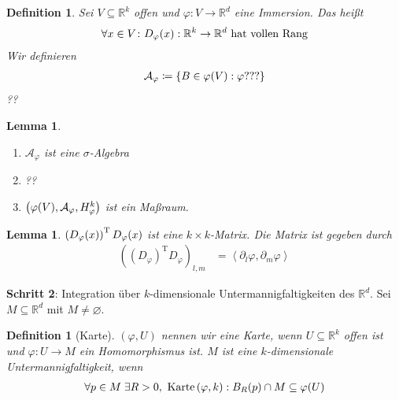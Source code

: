 \documentclass[11pt, twoside, a4paper]{article}
\theoremstyle{plain}
\newtheorem{definition}[blockelement]{Definition}
\newtheorem{lemma}[blockelement]{Lemma}
\numberwithin{equation}{subsection}
\newcommand{\set}[1]{\left\{#1\right\}}
\newcommand{\pair}[1]{\left(#1\right)}
\newcommand{\of}[1]{\mathopen{}\mathclose{}\bgroup\left(#1\aftergroup\egroup\right)}
\newcommand{\scalprod}[1]{\left<#1\right>}
\renewcommand{\emptyset}{\varnothing}
\newcommand{\ex}{\;\exists}
\newcommand{\theoremescape}{\leavevmode}
\newcommand{\R}{\mathbb{R}}
\newcommand{\mA}{\mathcal{A}}
\begin{document}
    \begin{definition}
        Sei $V\subseteq \R^k$ offen und $\varphi: V\to\R^d$ eine Immersion. Das heißt
        \begin{align*}
            \forall x\in V\colon D_{\varphi}\of{x}: \R^k \to\R^d\text{ hat vollen Rang}
        \end{align*}
        Wir definieren
        \begin{align*}
            \mA_{\varphi} \coloneqq \set{B\in\varphi\of{V}: \varphi ???}
        \end{align*}
        ??
    \end{definition}

    \begin{lemma}
        \theoremescape
        \begin{enumerate}[label=(\roman*)]
            \item $\mA_{\varphi}$ ist eine $\sigma$-Algebra
            \item ??
            \item $\pair{\varphi\of{V}, \mA_{\varphi}, H^k_{\varphi}}$ ist ein Maßraum.
        \end{enumerate}
    \end{lemma}

    \begin{lemma} %
        $\pair{D_{\varphi}\of{x}}^{\mathrm{T}}D_{\varphi}\of{x}$ ist eine $k\times k$-Matrix. Die Matrix ist gegeben durch
        \begin{align*}
            \pair{\pair{D_{\varphi}}^{\mathrm{T}}D_{\varphi}}_{l, m} &= \scalprod{\partial_l \varphi, \partial_m \varphi}
        \end{align*}
    \end{lemma}

    \noindent\textbf{Schritt 2}: Integration über $k$-dimensionale Untermannigfaltigkeiten des $\R^d$. Sei $M \subseteq \R^d$ mit $M\neq \emptyset$.

    \begin{definition}[Karte]
        $\pair{\varphi, U}$ nennen wir eine Karte, wenn $U\subseteq\R^k$ offen ist und $\varphi: U \to M$ ein Homomorphismus ist. $M$ ist eine $k$-dimensionale Untermannigfaltigkeit, wenn
        \begin{align*}
            \forall p\in M\ex R>0, \text{ Karte}\pair{\varphi, k}: B_{R}\of{p}\cap M \subseteq \varphi\of{U}
        \end{align*}
    \end{definition}
\end{document}
